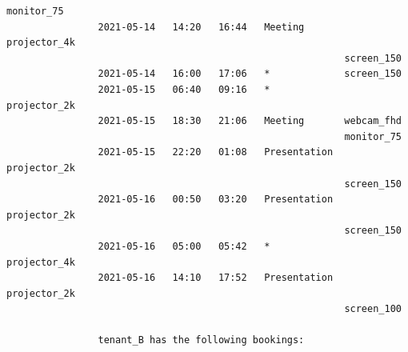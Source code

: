 \documentclass{article}
\begin{document}
\begin{Verbatim}[gobble=8]
                                                           monitor_75
                2021-05-14   14:20   16:44   Meeting       projector_4k
                                                           screen_150
                2021-05-14   16:00   17:06   *             screen_150
                2021-05-15   06:40   09:16   *             projector_2k
                2021-05-15   18:30   21:06   Meeting       webcam_fhd
                                                           monitor_75
                2021-05-15   22:20   01:08   Presentation  projector_2k
                                                           screen_150
                2021-05-16   00:50   03:20   Presentation  projector_2k
                                                           screen_150
                2021-05-16   05:00   05:42   *             projector_4k
                2021-05-16   14:10   17:52   Presentation  projector_2k
                                                           screen_100
                
                tenant_B has the following bookings:
                

\end{Verbatim}
\end{document}

